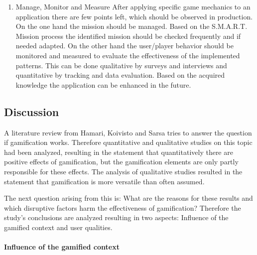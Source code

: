 \begin{enumerate}
	\item Manage, Monitor and Measure \newline
	After applying specific game mechanics to an application there are few points left, which should be observed in production. On the one hand the mission should be managed. Based on the S.M.A.R.T. Mission process the identified mission should be checked frequently and if needed adapted. On the other hand the user/player behavior should be monitored and measured to evaluate the effectiveness of the implemented patterns. This can be done qualitative by surveys and interviews and quantitative by tracking and data evaluation. Based on the acquired knowledge the application can be enhanced in the future.	\cite[p. 92-96]{kumarGamificationWorkDesigning2013}
\end{enumerate}

\newpage

\subsection{Discussion}
\label{sec:theoryBe}

A literature review from Hamari, Koivisto and Sarsa \cite{hamariDoesGamificationWork2014} tries to answer the question if gamification works. Therefore quantitative and qualitative studies on this topic had been analyzed, resulting in the statement that quantitatively there are positive effects of gamification, but the gamification elements are only partly responsible for these effects. The analysis of qualitative studies resulted in the statement that gamification is more versatile than often assumed. \cite[p. 3029, 3030]{hamariDoesGamificationWork2014} 

The next question arising from this is: What are the reasons for these results and which disruptive factors harm the effectiveness of gamification? Therefore the study's conclusions are analyzed resulting in two aspects: Influence of the gamified context and user qualities. \cite[p. 3029, 3030]{hamariDoesGamificationWork2014}

\paragraph*{Influence of the gamified context}

